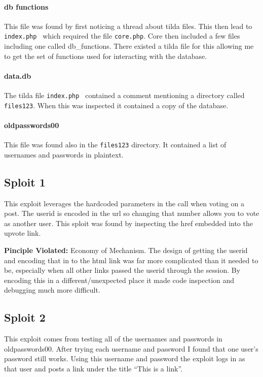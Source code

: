 \documentclass{article}
\begin{document}
	\paragraph{db functions} %
	\label{par:db_functions}
	This file was found by first noticing a thread about tilda files. This then lead to \texttt{index.php~} which required the file \texttt{core.php}. Core then included a few files including one called db\_functions. There existed a tilda file for this allowing me to get the set of functions used for interacting with the database.

	\paragraph{data.db} %
	\label{par:data_db}
	The tilda file \texttt{index.php~} contained a comment mentioning a directory called \texttt{files123}. When this was inspected it contained a copy of the database.

	\paragraph{oldpasswords00} %
	\label{par:oldpasswords00}
	This file was found also in the \texttt{files123} directory. It contained a list of usernames and passwords in plaintext.


	\subsection*{Sploit 1} %
	\label{sub:sploit_1}
	This exploit leverages the hardcoded parameters in the call when voting on a post. The userid is encoded in the url so changing that number allows you to vote as another user. This sploit was found by inspecting the href embedded into the upvote link.

	\textbf{Pinciple Violated: }Economy of Mechanism. The design of getting the userid and encoding that in to the html link was far more complicated than it needed to be, especially when all other links passed the userid through the session. By encoding this in a different/unexpected place it made code inspection and debugging much more difficult.


	\subsection*{Sploit 2} %
	\label{sub:sploit_2}
	This exploit comes from testing all of the usernames and passwords in oldpasswords00. After trying each username and password I found that one user's password still works. Using this username and password the exploit logs in as that user and posts a link under the title ``This is a link''.
\end{document}
